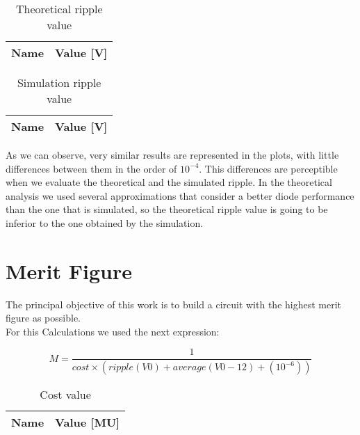 \vspace{0.3in}
\begin{table}[ht]
  \centering
  \begin{tabular}{|l|r|}
    \hline    
    {\bf Name} & {\bf Value [V]} \\ \hline
    
  \end{tabular}
  \caption{Theoretical ripple value}
  \label{tab:3}
\end{table}

\vspace{0.3in}
\begin{table}[ht]
  \centering
  \begin{tabular}{|l|r|}
    \hline    
    {\bf Name} & {\bf Value [V]} \\ \hline
    
  \end{tabular}
  \caption{Simulation ripple value}
  \label{tab:4}
\end{table}


As we can observe, very similar results are represented in the plots, with little differences between them in the order of $10^{-4}$. This differences are perceptible when we evaluate the theoretical and the simulated ripple. In the theoretical analysis we used several approximations that consider a better diode performance than the one that is simulated, so the theoretical ripple value is going to be inferior to the one obtained by the simulation.


\section{Merit Figure}

The principal objective of this work is to build a circuit with the highest merit figure as possible.\\
For this Calculations we used the next expression:

\begin{equation}
    M = \frac{1}{cost\times(ripple(V0) + average(V0-12) + (10^{-6}))}  
\end{equation}

\vspace{0.3in}
\begin{table}[H]
  \centering
  \begin{tabular}{|l|r|}
    \hline    
    {\bf Name} & {\bf Value [MU]} \\ \hline
    
  \end{tabular}
  \caption{Cost value}
  \label{tab:7}
\end{table}


